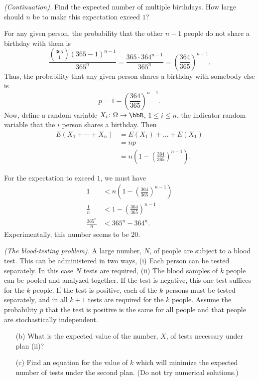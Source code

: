 \begin{problem}[Handout 6, \# 11]
  \emph{(Continuation).} Find the expected number of multiple
  birthdays. How large should \(n\) be to make this expectation exceed
  \(1\)?
\end{problem}
\begin{solution}
  For any given person, the probability that the other \(n-1\) people do
  not share a birthday with them is
  \[
    \frac{\binom{365}{1}(365-1)^{n-1}}{365^n}=\frac{365\cdot 364^{n-1}}{365^n}
    =\left(\frac{364}{365}\right)^{n-1}.
  \]
  Thus, the probability that any given person shares a birthday with
  somebody else is
  \[
    p=1-\left(\frac{364}{365}\right)^{n-1}.
  \]
  Now, define a random variable \(X_i\colon\Omega\to\bbR\),
  \(1\leq i\leq n\), the indicator random variable that the
  \(i\) person shares a birthday. Then
  \begin{align*}
    E(X_1+\dotsb+X_n)
    &=E(X_1)+\dotsc+E(X_1)\\
    &=n p\\
    &=n\left(1-\left(\frac{364}{365}\right)^{n-1}\right).
  \end{align*}

  For the expectation to exceed \(1\), we must have
  \begin{align*}
    1
    &<n\left(1-\left(\frac{364}{365}\right)^{n-1}\right)\\
    \frac{1}{n}&<1-\left(\frac{364}{365}\right)^{n-1}\\
    \frac{365^n}{n}&<365^n-364^n.
  \end{align*}
  Experimentally, this number seems to be \(20\).
\end{solution}
\newpage

\begin{problem}[Handout 6, \# 12]
  \emph{(The blood-testing problem).} A large number, \(N\), of people are
  subject to a blood test. This can be administered in two ways, (i) Each
  person can be tested separately. In this case \(N\) tests are required,
  (ii) The blood samples of \(k\) people can be pooled and analyzed
  together. If the test is negative, this one test suffices for the \(k\)
  people. If the test is positive, each of the \(k\) persons must be tested
  separately, and in all \(k+1\) tests are required for the \(k\)
  people. Assume the probability \(p\) that the test is positive is the
  same for all people and that people are stochastically independent.
  \begin{itemize}[noitemsep]
  \item[(b)] What is the expected value of the number, \(X\), of tests
    necessary under plan (ii)?
  \item[(c)] Find an equation for the value of \(k\) which will minimize
    the expected number of tests under the second plan. (Do not try
    numerical solutions.)
  \end{itemize}
\end{problem}
\begin{solution}

\end{solution}
\newpage

